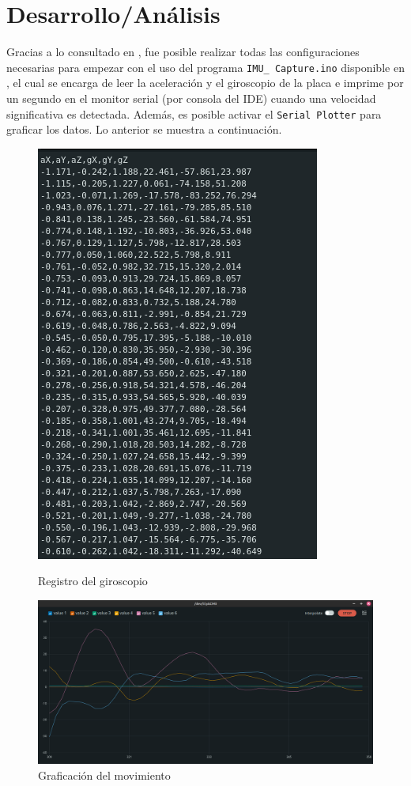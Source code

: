 \section{Desarrollo/Análisis}
Gracias a lo consultado en \cite{web3}, fue posible realizar todas las configuraciones necesarias para empezar con el uso del programa \texttt{IMU\_ Capture.ino} disponible en \cite{ArduinoSketches1}, el cual se encarga de leer la aceleración y el giroscopio de la placa e imprime por un segundo en el monitor serial (por consola del IDE) cuando una velocidad significativa es detectada. Además, es posible activar el \texttt{Serial Plotter} para graficar los datos. Lo anterior se muestra a continuación.

\begin{figure}[H]
   \begin{minipage}{0.48\textwidth}
     \centering
     \includegraphics[width=.7\linewidth]{Imagenes/4}
     \caption{ Registro del giroscopio}\label{Fig_4}
   \end{minipage}\hfill
   \begin{minipage}{0.7\textwidth}
     \centering
     \includegraphics[width=.7\linewidth]{Imagenes/5.png}
     \caption{Graficación del movimiento }\label{Fig_5}
   \end{minipage}
\end{figure}
